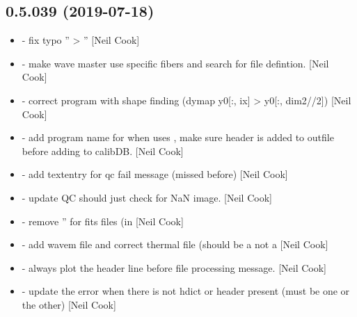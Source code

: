 \documentclass[a4paper,10pt,english]{report}
\begin{document}
\subsection{0.5.039 (2019-07-18)}
\label{\detokenize{misc/changelog:id102}}\begin{itemize}
\item {} 
 - fix typo ” \textendash{}\textgreater{} ” {[}Neil
Cook{]}

\item {} 
 - make wave master use specific fibers and search for file
defintion. {[}Neil Cook{]}

\item {} 
 - correct program with shape finding (dymap y0{[}:, ix{]} \textendash{}\textgreater{}
y0{[}:, dim2//2{]}) {[}Neil Cook{]}

\item {} 
 - add program name for when  uses
 , make sure header is added to outfile
before adding to calibDB. {[}Neil Cook{]}

\item {} 
 - add textentry for qc fail message (missed before)
{[}Neil Cook{]}

\item {} 
 - update QC should just check for NaN image.
{[}Neil Cook{]}

\item {} 
 - remove ” for fits files (in 
{[}Neil Cook{]}

\item {} 
 - add wavem file and correct thermal file (should
be a  not a  {[}Neil Cook{]}

\item {} 
 - always plot the header line before file processing
message. {[}Neil Cook{]}

\item {} 
 - update the error when there is not hdict or header
present (must be one or the other) {[}Neil Cook{]}


\end{itemize}
\end{document}
